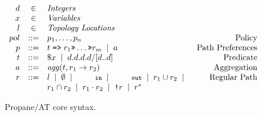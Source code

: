 \documentclass[numbers, 10pt, preprint]{sigplanconf}
\newcommand{\sysname}{{\text{}\small \sf Propane/AT}\xspace}
\newcommand{\CD}[1]{\texttt{\small #1}}
\newcommand{\Prefer}{\texttt{>>}}
\newcommand{\Path}{\texttt{=>}}
\newcommand{\NOT}{\texttt{!}}
\renewcommand{\path}[2]{ #1 \mapsto \ensuremath{#2} }
\newcommand{\BNFALT}{\;\;|\;\;}
\begin{document}
\begin{figure}[t]\small
  \begin{minipage}[t]{\linewidth}
  \vspace*{-1\baselineskip}
  \[ \begin{array}{rclr}
     d       &\in& \textit{Integers} \\
     x       &\in& \textit{Variables} \\
     l       &\in& \textit{Topology Locations} \\
     pol     &::=& p_1, \dots, p_n & \text{Policy} \\
     p       &::=& t \hspace{.3em} \Path \hspace{.3em} r_1 \Prefer \dots \Prefer r_m \BNFALT a & \text{Path Preferences}  \\
     t       &::=& \$x \BNFALT d.d.d.d/[d..d] \hspace{1.5em} & \text{Predicate} \\
     a      &::=& \mathit{agg}(t, r_1 \rightarrow r_2) & \text{Aggregation} \\
     r       &::=& l \BNFALT \emptyset \BNFALT \CD{in} \BNFALT \CD{out} \BNFALT r_1 \cup r_2 \BNFALT & \text{Regular Path} \\
             &   & r_1 \cap r_2 \BNFALT r_1 \cdot r_2 \BNFALT \NOT r \BNFALT r^* \\
  \end{array} \]%

  \end{minipage}
  \vspace{-.4em}
  \caption{\sysname core syntax.}
  \label{fig:syntax}
  \vspace{-0.8em}
\end{figure}%




\newcommand{\state}[4]{\node[state,#3](#1)[#4]{#2};}
\newcommand{\transition}[4]{\path[->] (#1) edge [#4] node {#3} (#2);}
\end{document}
